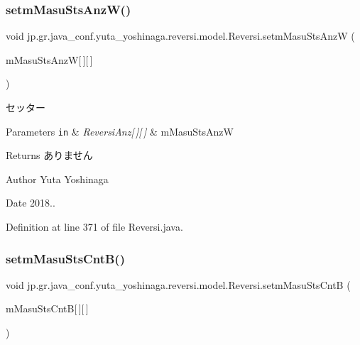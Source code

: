 \subsubsection{\texorpdfstring{setm\+Masu\+Sts\+Anz\+W()}{setmMasuStsAnzW()}}
{\footnotesize\ttfamily void jp.\+gr.\+java\+\_\+conf.\+yuta\+\_\+yoshinaga.\+reversi.\+model.\+Reversi.\+setm\+Masu\+Sts\+AnzW (\begin{DoxyParamCaption}\item[{\hyperlink{classjp_1_1gr_1_1java__conf_1_1yuta__yoshinaga_1_1reversi_1_1model_1_1_reversi_anz}{Reversi\+Anz}}]{m\+Masu\+Sts\+AnzW\mbox{[}$\,$\mbox{]}\mbox{[}$\,$\mbox{]} }\end{DoxyParamCaption})}



セッター 


\begin{DoxyParams}[1]{Parameters}
\mbox{\tt in}  & {\em Reversi\+Anz\mbox{[}$\,$\mbox{]}\mbox{[}$\,$\mbox{]}} & m\+Masu\+Sts\+AnzW \\
\hline
\end{DoxyParams}
\begin{DoxyReturn}{Returns}
ありません 
\end{DoxyReturn}
\begin{DoxyAuthor}{Author}
Yuta Yoshinaga 
\end{DoxyAuthor}
\begin{DoxyDate}{Date}
2018.. 
\end{DoxyDate}


Definition at line 371 of file Reversi.\+java.

\mbox{\label{classjp_1_1gr_1_1java__conf_1_1yuta__yoshinaga_1_1reversi_1_1model_1_1_reversi_a9da75ee353d369b909c36d9f4ca5e967}} 
\subsubsection{\texorpdfstring{setm\+Masu\+Sts\+Cnt\+B()}{setmMasuStsCntB()}}
{\footnotesize\ttfamily void jp.\+gr.\+java\+\_\+conf.\+yuta\+\_\+yoshinaga.\+reversi.\+model.\+Reversi.\+setm\+Masu\+Sts\+CntB (\begin{DoxyParamCaption}\item[{int}]{m\+Masu\+Sts\+CntB\mbox{[}$\,$\mbox{]}\mbox{[}$\,$\mbox{]} }\end{DoxyParamCaption})}



